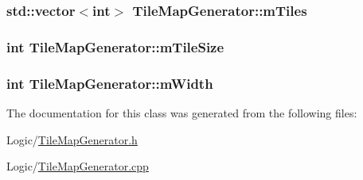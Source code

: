 \subsubsection[{\texorpdfstring{m\+Tiles}{mTiles}}]{\setlength{\rightskip}{0pt plus 5cm}std\+::vector$<$int$>$ Tile\+Map\+Generator\+::m\+Tiles\hspace{0.3cm}{\ttfamily [private]}}\hypertarget{classTileMapGenerator_a56f5a8a73968d218f891c06550caeacf}{}\label{classTileMapGenerator_a56f5a8a73968d218f891c06550caeacf}
\subsubsection[{\texorpdfstring{m\+Tile\+Size}{mTileSize}}]{\setlength{\rightskip}{0pt plus 5cm}int Tile\+Map\+Generator\+::m\+Tile\+Size\hspace{0.3cm}{\ttfamily [private]}}\hypertarget{classTileMapGenerator_a1283774e574f8cad65f5655ed44f2f58}{}\label{classTileMapGenerator_a1283774e574f8cad65f5655ed44f2f58}
\subsubsection[{\texorpdfstring{m\+Width}{mWidth}}]{\setlength{\rightskip}{0pt plus 5cm}int Tile\+Map\+Generator\+::m\+Width\hspace{0.3cm}{\ttfamily [private]}}\hypertarget{classTileMapGenerator_a5465fd60f8897f7a6f9347091a20db85}{}\label{classTileMapGenerator_a5465fd60f8897f7a6f9347091a20db85}


The documentation for this class was generated from the following files\+:\begin{DoxyCompactItemize}
\item 
Logic/\hyperlink{TileMapGenerator_8h}{Tile\+Map\+Generator.\+h}\item 
Logic/\hyperlink{TileMapGenerator_8cpp}{Tile\+Map\+Generator.\+cpp}\end{DoxyCompactItemize}
